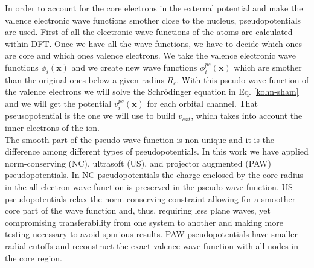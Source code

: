 In order to account for the core electrons in the external potential and make the valence electronic wave functions smother close to the nucleus, pseudopotentials are used. First of all the electronic wave functions of the 
atoms are calculated within DFT. Once we have all the wave functions, we have to decide which ones are core and which ones valence electrons. We take the valence electronic wave functions $\phi_{i}(\mathbf{x})$ and we 
create new wave functions $\phi_{i}^{ps}(\mathbf{x})$ which are smother than the original ones below a given radius $R_{c}$. With this pseudo wave function of the valence electrons we will solve the Schr\"{o}dinger equation in 
Eq. \ref{kohn-sham} and we will get the potential $v_{i}^{ps}(\mathbf{x})$ for each orbital channel. That pseusopotential is the one we will use to build $v_{ext}$, which takes into account the inner electrons of 
the ion. \\

The smooth part of the pseudo wave function is non-unique and it is the difference among different types of pseudopotentials. In this work we have applied 
norm-conserving\cite{hamann1979norm,troullier1991efficient} (NC), ultrasoft\cite{vanderbilt1990soft} (US), and projector augmented\cite{blochl1994projector} (PAW) pseudopotentials. In NC pseudopotentials the 
charge enclosed by the core radius in the all-electron wave function is preserved in the pseudo wave function. US pseudopotentials relax the norm-conserving constraint allowing for a smoother core 
part of the wave function and, thus, requiring less plane waves, yet compromising transferability from one system to another and making more testing necessary to avoid spurious results. PAW pseudopotentials have 
smaller radial cutoffs and reconstruct the exact valence wave function with all nodes in the core region.
